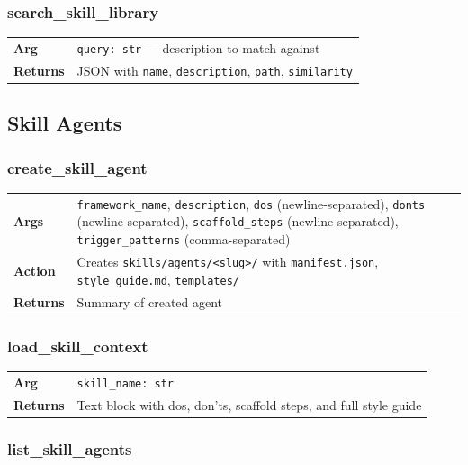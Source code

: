 \documentclass[11pt,a4paper]{article}
\begin{document}
\subsubsection{search\_skill\_library}

\begin{tabular}{@{}lp{10cm}@{}}
\textbf{Arg} & \texttt{query: str} --- description to match against \\
\textbf{Returns} & JSON with \texttt{name}, \texttt{description}, \texttt{path}, \texttt{similarity} \\
\end{tabular}

\subsection{Skill Agents}

\subsubsection{create\_skill\_agent}

\begin{tabular}{@{}lp{10cm}@{}}
\textbf{Args} & \texttt{framework\_name}, \texttt{description}, \texttt{dos} (newline-separated), \texttt{donts} (newline-separated), \texttt{scaffold\_steps} (newline-separated), \texttt{trigger\_patterns} (comma-separated) \\
\textbf{Action} & Creates \texttt{skills/agents/<slug>/} with \texttt{manifest.json}, \texttt{style\_guide.md}, \texttt{templates/} \\
\textbf{Returns} & Summary of created agent \\
\end{tabular}

\subsubsection{load\_skill\_context}

\begin{tabular}{@{}lp{10cm}@{}}
\textbf{Arg} & \texttt{skill\_name: str} \\
\textbf{Returns} & Text block with dos, don'ts, scaffold steps, and full style guide \\
\end{tabular}

\subsubsection{list\_skill\_agents}
\end{document}
